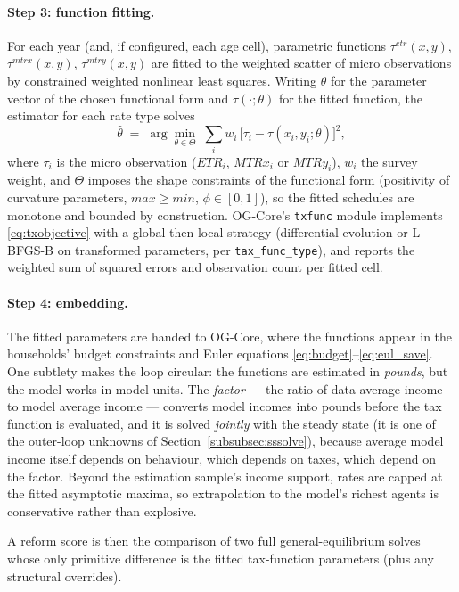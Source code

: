 \paragraph{Step 3: function fitting.} For each year (and, if configured, each age cell), parametric functions $\tau^{etr}(x,y)$, $\tau^{mtrx}(x,y)$, $\tau^{mtry}(x,y)$ are fitted to the weighted scatter of micro observations by constrained weighted nonlinear least squares. Writing $\theta$ for the parameter vector of the chosen functional form and $\tau(\cdot;\theta)$ for the fitted function, the estimator for each rate type solves
\begin{equation}
\label{eq:txobjective}
\hat{\theta} \;=\; \arg\min_{\theta\in\Theta}\;
\sum_{i} w_i\,\bigl[\tau_i - \tau(x_i, y_i;\theta)\bigr]^2 ,
\end{equation}
where $\tau_i$ is the micro observation ($ETR_i$, $MTRx_i$ or $MTRy_i$), $w_i$ the survey weight, and $\Theta$ imposes the shape constraints of the functional form (positivity of curvature parameters, $max \ge min$, $\phi\in[0,1]$), so the fitted schedules are monotone and bounded by construction. OG-Core's \texttt{txfunc} module implements \eqref{eq:txobjective} with a global-then-local strategy (differential evolution or L-BFGS-B on transformed parameters, per \texttt{tax\_func\_type}), and reports the weighted sum of squared errors and observation count per fitted cell.

\paragraph{Step 4: embedding.} The fitted parameters are handed to OG-Core, where the functions appear in the households' budget constraints and Euler equations \eqref{eq:budget}--\eqref{eq:eul_save}. One subtlety makes the loop circular: the functions are estimated in \emph{pounds}, but the model works in model units. The \emph{factor} --- the ratio of data average income to model average income --- converts model incomes into pounds before the tax function is evaluated, and it is solved \emph{jointly} with the steady state (it is one of the outer-loop unknowns of Section~\ref{subsubsec:sssolve}), because average model income itself depends on behaviour, which depends on taxes, which depend on the factor. Beyond the estimation sample's income support, rates are capped at the fitted asymptotic maxima, so extrapolation to the model's richest agents is conservative rather than explosive.

A reform score is then the comparison of two full general-equilibrium solves whose only primitive difference is the fitted tax-function parameters (plus any structural overrides).

